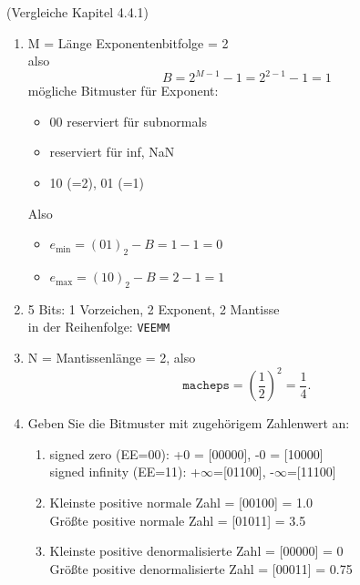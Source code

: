 (Vergleiche Kapitel 4.4.1)
	\begin{enumerate}
		\item  M = Länge Exponentenbitfolge = 2\\
		 also  $$B= 2^{M-1}-1 = 2^{2-1}-1 = 1$$
		mögliche Bitmuster für Exponent:
		\begin{itemize}
			\item 00 reserviert für subnormals  
			\item reserviert für inf, NaN
			\item 10 (=2), 01 (=1) 
		\end{itemize} 
		Also 
		\begin{itemize}
			\item  $e_{\text{min}} = (01)_2 - B = 1- 1 = 0$
			\item $e_{\text{max}}= (10)_2 - B = 2- 1 = 1$ 
		\end{itemize}
		\item  5 Bits: 1 Vorzeichen, 2 Exponent, 2 Mantisse \\ in der Reihenfolge: \texttt{VEEMM}%
		\item N = Mantissenlänge = 2, also $$\texttt{macheps}=(\frac{1}{2})^2=\frac{1}{4}.$$
		\item Geben Sie die Bitmuster mit zugehörigem Zahlenwert an:
		\begin{enumerate}
			\item signed zero (EE=00): +0 = [00000], -0 = [10000]\\
			signed infinity (EE=11):  +$\infty$=[01100], -$\infty$=[11100]
			\item Kleinste positive normale Zahl = [00100] = 1.0\\
			Größte positive normale Zahl = [01011] = 3.5
			\item Kleinste  positive denormalisierte Zahl = [00000] = 0 \\
			Größte positive denormalisierte Zahl = [00011] = 0.75
		\end{enumerate}
	\end{enumerate}

